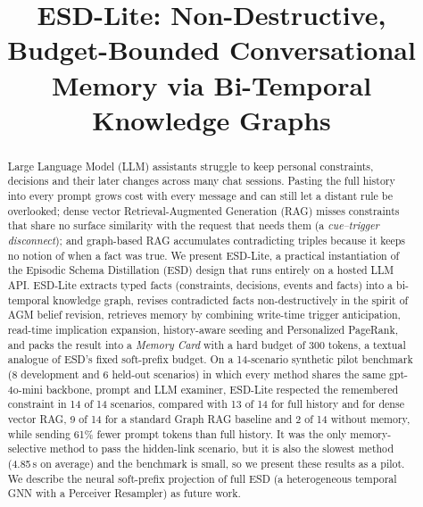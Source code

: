 \documentclass[conference]{IEEEtran}
\begin{document}
\title{ESD-Lite: Non-Destructive, Budget-Bounded Conversational Memory via Bi-Temporal Knowledge Graphs}

\author{
\and
{}
\and
{}
}

\maketitle

\begin{abstract}
Large Language Model (LLM) assistants struggle to keep personal constraints, decisions and their later changes across many chat sessions. Pasting the full history into every prompt grows cost with every message and can still let a distant rule be overlooked; dense vector Retrieval-Augmented Generation (RAG) misses constraints that share no surface similarity with the request that needs them (a \emph{cue--trigger disconnect}); and graph-based RAG accumulates contradicting triples because it keeps no notion of when a fact was true. We present ESD-Lite, a practical instantiation of the Episodic Schema Distillation (ESD) design that runs entirely on a hosted LLM API. ESD-Lite extracts typed facts (constraints, decisions, events and facts) into a bi-temporal knowledge graph, revises contradicted facts non-destructively in the spirit of AGM belief revision, retrieves memory by combining write-time trigger anticipation, read-time implication expansion, history-aware seeding and Personalized PageRank, and packs the result into a \emph{Memory Card} with a hard budget of 300 tokens, a textual analogue of ESD's fixed soft-prefix budget. On a 14-scenario synthetic pilot benchmark (8 development and 6 held-out scenarios) in which every method shares the same gpt-4o-mini backbone, prompt and LLM examiner, ESD-Lite respected the remembered constraint in 14 of 14 scenarios, compared with 13 of 14 for full history and for dense vector RAG, 9 of 14 for a standard Graph RAG baseline and 2 of 14 without memory, while sending 61\% fewer prompt tokens than full history. It was the only memory-selective method to pass the hidden-link scenario, but it is also the slowest method (4.85\,s on average) and the benchmark is small, so we present these results as a pilot. We describe the neural soft-prefix projection of full ESD (a heterogeneous temporal GNN with a Perceiver Resampler) as future work.
\end{abstract}
\end{document}
